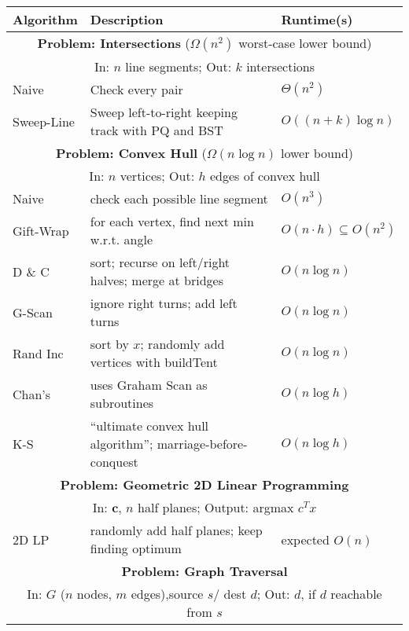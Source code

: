 \documentclass[11pt]{article}
\begin{document}
\thispagestyle{plain}
\begin{tabular}{|p{20mm} | p{100mm} | p{30mm}|}
\hline
Algorithm & Description & Runtime(s) \\
\hline
\multicolumn{3}{|c|}{{\bf Problem: Intersections} ($\Omega(n^2)$ worst-case lower
                                                                    bound)} \\
\multicolumn{3}{|c|}{In: $n$ line segments; Out: $k$ intersections} \\
\hline
Naive
          & Check every pair
          & $\Theta(n^2)$ \\
\hline
Sweep-Line
          & Sweep left-to-right keeping track with PQ and BST
          & $O((n + k) \log n)$ \\
\hline
\multicolumn{3}{|c|}{{\bf Problem: Convex Hull} ($\Omega(n \log n)$ lower bound)} \\
\multicolumn{3}{|c|}{In: $n$ vertices; Out: $h$ edges of convex hull} \\
\hline
Naive
          & check each possible line segment 
          & $O(n^3)$ \\
\hline
Gift-Wrap
          & for each vertex, find next min w.r.t. angle
          & $O(n\cdot h) \subseteq O(n^2)$ \\
\hline
D \& C
          & sort; recurse on left/right halves; merge at bridges
          & $O(n \log n)$ \\
\hline
G-Scan
          & ignore right turns; add left turns
          & $O(n \log n)$ \\
\hline
Rand Inc
          & sort by $x$; randomly add vertices with buildTent
          & $O(n \log n)$ \\
\hline
Chan's
          & uses Graham Scan as subroutines
          & $O(n \log h)$ \\
\hline
K-S
          & ``ultimate convex hull algorithm''; marriage-before-conquest
          & $O(n \log h)$ \\
\hline
\multicolumn{3}{|c|}{{\bf Problem: Geometric 2D Linear Programming}} \\
\multicolumn{3}{|c|}{In: $\mathbf{c}$, $n$ half planes; Output: argmax $c^Tx$} \\
\hline
2D LP
          & randomly add half planes; keep finding optimum
          & expected $O(n)$ \\
\hline
\multicolumn{3}{|c|}{{\bf Problem: Graph Traversal}} \\
\multicolumn{3}{|c|}{In: $G$ ($n$ nodes, $m$ edges),source $s$/ dest $d$;
Out: $d$, if $d$ reachable from $s$} \\

\end{tabular}
\end{document}
